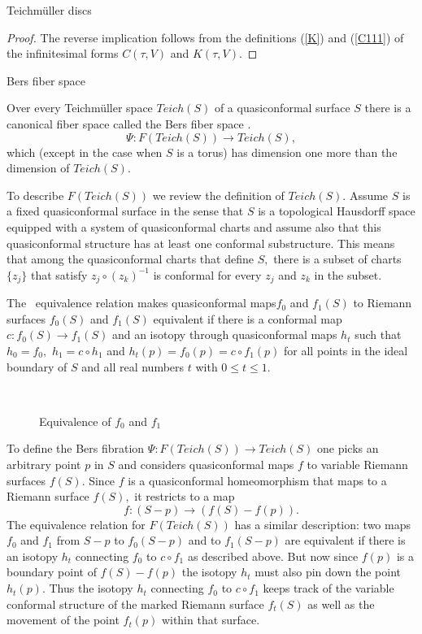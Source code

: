 \documentclass[12pt]{amsart}
\theoremstyle{remark}
\theoremstyle{definition}
\theoremstyle{definition}
\begin{document}
\begin{section}{Teichm\"uller discs}
\begin{proof}
 The reverse implication follows from the definitions (\ref{K}) and (\ref{C111}) of the infinitesimal forms $C(\tau,V)$ and $K(\tau,V).$ 
 \end{proof}
 
 
      \hspace{.1in}\end{section}
           
\begin{section}{Bers fiber space}\label{Bers}

Over every Teichm\"uller space $Teich(S)$ of a quasiconformal surface $S$ there is a canonical fiber space 
 called the Bers fiber space \cite{Bers5}.   
$$ \Psi:F(Teich(S)) \rightarrow Teich(S),$$ 
which (except in the case when $S$ is a torus) has dimension one more than the dimension of $Teich(S).$


To describe $F(Teich(S))$ we review the definition of $Teich(S).$ Assume $S$ is a fixed quasiconformal surface in the sense that $S$ is a topological Hausdorff space equipped with a system of quasiconformal charts  and assume also that this quasiconformal structure has at least one conformal substructure.  This means that among the quasiconformal charts that define $S,$ there is a subset of charts $\{z_j\}$ that satisfy  $z_j \circ (z_k)^{-1}$ is conformal for every $z_j$ and $z_k$ in the subset.
   
   The \te\ equivalence relation makes quasiconformal maps$f_0$ and $f_1(S)$ to Riemann surfaces $f_0(S)$ and $f_1(S) $ equivalent if there is a conformal map $c:f_0(S) \rightarrow f_1(S)$ and an isotopy through quasiconformal maps $h_t$ such that $h_0=f_0,$ $h_1 = c \circ h_1$ and $h_t(p)=f_0(p)=c \circ f_1(p)$ for all points in the ideal boundary of $S$ and all real numbers $t$ with $0 \leq t \leq 1.$
   
  


\begin{figure}[htp]~\label{figure0}
\hspace{.2in}
\caption{Equivalence of $f_0$ and $f_1$}
\end{figure}

To define the Bers fibration $\Psi: F(Teich(S)) \rightarrow Teich(S)$ one picks an arbitrary point $p$ in $S$ and considers quasiconformal maps $f$ to variable Riemann surfaces $f(S).$ Since $f$ is a quasiconformal homeomorphism that maps to a Riemann surface $f(S),$ it restricts to a map 
$$f: (S-p) \rightarrow (f(S)-f(p)).$$  The equivalence relation for $F(Teich(S))$  has a similar description: two maps $f_0$ and $f_1$ from $S-p$ to $f_0(S-p)$ and  to $f_1(S-p)$ are equivalent if
there  is an isotopy $h_t$ connecting $f_0$ to $c \circ f_1$ as described above.  But now since $f(p)$ is a boundary point of  $f(S)-f(p)$ the isotopy $h_t$ must also pin down  the point $h_t(p).$  Thus the isotopy $h_t$ connecting 
$f_0$ to $c \circ f_1$ keeps track of the variable conformal structure of the marked Riemann surface $f_t(S)$  as well as the movement of the point $f_t(p)$ within that surface. 


\end{section}
\end{document}
